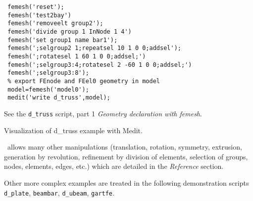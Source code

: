 \begin{itemize}
\begin{OPENFEM}
\begin{verbatim}
 femesh('reset');
 femesh('test2bay')
 femesh('removeelt group2');
 femesh('divide group 1 InNode 1 4')
 femesh('set group1 name bar1');
 femesh(';selgroup2 1;repeatsel 10 1 0 0;addsel');
 femesh(';rotatesel 1 60 1 0 0;addsel;')
 femesh(';selgroup3:4;rotatesel 2 -60 1 0 0;addsel;')
 femesh(';selgroup3:8');
 % export FEnode and FEel0 geometry in model
 model=femesh('model0');  
 medit('write d_truss',model);
\end{verbatim}
\end{OPENFEM}
See the {\tt d\_truss} script, part 1 {\sl Geometry declaration with femesh}.
\end{itemize}

\begin{center}
\begin{figure}[H]
\centering
{} %
\end{figure}

Visualization of d\_truss example with Medit.
\end{center}

\femesh\ allows many other manipulations (translation, rotation, 
symmetry, extrusion, generation by revolution, refinement by division 
of elements, selection of groups, nodes, elements, edges, etc.) which 
are detailed in the {\sl Reference} section.

\begin{SDT}
Other more complex examples are treated in the following demonstration scripts
{\tt d\_plate}, {\tt beambar}, {\tt d\_ubeam}, {\tt gartfe}.
\end{SDT}

